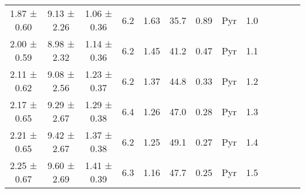 \begin{table}[htbp]
\begin{adjustbox}{width=\textwidth}
\begin{tabular}{ccccccccccccc}
            1.87 ± 0.60 & 9.13 ± 2.26 & 1.06 ± 0.36 & 6.2 & 1.63 & 35.7 & 0.89 & Pyr & 1.0 \\
            2.00 ± 0.59 & 8.98 ± 2.32 & 1.14 ± 0.36 & 6.2 & 1.45 & 41.2 & 0.47 & Pyr & 1.1 \\
            2.11 ± 0.62 & 9.08 ± 2.56 & 1.23 ± 0.37 & 6.2 & 1.37 & 44.8 & 0.33 & Pyr & 1.2 \\
            2.17 ± 0.65 & 9.29 ± 2.67 & 1.29 ± 0.38 & 6.4 & 1.26 & 47.0 & 0.28 & Pyr & 1.3 \\
            2.21 ± 0.65 & 9.42 ± 2.67 & 1.37 ± 0.38 & 6.2 & 1.25 & 49.1 & 0.27 & Pyr & 1.4 \\
            2.25 ± 0.67 & 9.60 ± 2.69 & 1.41 ± 0.39 & 6.3 & 1.16 & 47.7 & 0.25 & Pyr & 1.5 \\
            \hline
        \end{tabular}
    \end{adjustbox}
\end{table}
